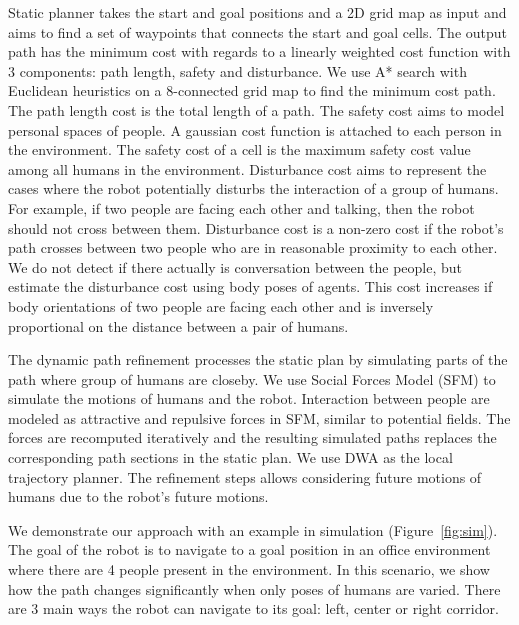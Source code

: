 \documentclass[3p]{elsarticle}
\begin{document}
Static planner takes the start and goal positions and a 2D grid map as input and aims to find a set of waypoints that connects the start and goal cells. The output path has the minimum cost with regards to a linearly weighted cost function with 3 components: path length, safety and disturbance. We use A* search with Euclidean heuristics on a 8-connected grid map to find the minimum cost path. The path length cost is the total length of a path. The safety cost aims to model personal spaces of people. A gaussian cost function is attached to each person in the environment. The safety cost of a cell is the maximum safety cost value among all humans in the environment. Disturbance cost aims to represent the cases where the robot potentially disturbs the interaction of a group of humans. For example, if two people are facing each other and talking, then the robot should not cross between them. Disturbance cost is a non-zero cost if the robot's path crosses between two people who are in reasonable proximity to each other. We do not detect if there actually is conversation between the people, but estimate the disturbance cost using body poses of agents. This cost increases if body orientations of two people are facing each other and is inversely proportional on the distance between a pair of humans. 

The dynamic path refinement processes the static plan by simulating parts of the path where group of humans are closeby. We use Social Forces Model (SFM) \cite{helbing1995social} to simulate the motions of humans and the robot. Interaction between people are modeled as attractive and repulsive forces in SFM, similar to potential fields. The forces are recomputed iteratively and the resulting simulated paths replaces the corresponding path sections in the static plan. We use DWA as the local trajectory planner. The refinement steps allows considering future motions of humans due to the robot's future motions.

We demonstrate our approach with an example in simulation (Figure~\ref{fig:sim}). The goal of the robot is to navigate to a goal position in an office environment where there are 4 people present in the environment. In this scenario, we show how the path changes significantly when only poses of humans are varied. There are 3 main ways the robot can navigate to its goal: left, center or right corridor.
\end{document}
